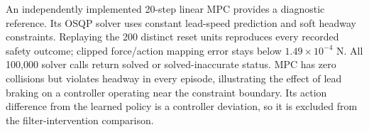 An independently implemented 20-step linear MPC provides a diagnostic
reference. Its OSQP solver \cite{osqp2020} uses constant lead-speed prediction
and soft headway constraints. Replaying the 200 distinct reset units
reproduces every recorded safety outcome; clipped force/action mapping
error stays below $1.49\times10^{-4}$ N. All 100,000 solver calls return
solved or solved-inaccurate status. MPC has zero collisions but violates
headway in every episode, illustrating the effect of lead braking on a
controller operating near the constraint boundary. Its action difference
from the learned policy is a controller deviation, so it is excluded from
the filter-intervention comparison.
